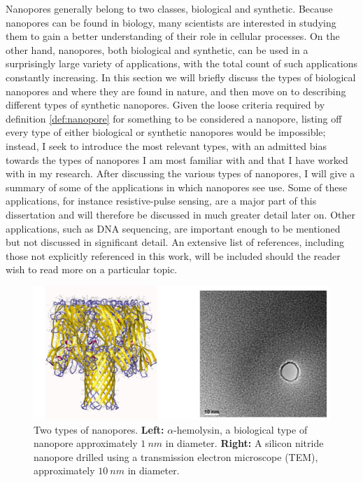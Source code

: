 		Nanopores generally belong to two classes, biological and synthetic. Because nanopores can be found in biology, many scientists are interested in studying them to gain a better understanding of their role in cellular processes. On the other hand, nanopores, both biological and synthetic, can be used in a surprisingly large variety of applications, with the total count of such applications constantly increasing. In this section we will briefly discuss the types of biological nanopores and where they are found in nature, and then move on to describing different types of synthetic nanopores. Given the loose criteria required by definition \ref{def:nanopore} for something to be considered a nanopore, listing off every type of either biological or synthetic nanopores would be impossible; instead, I seek to introduce the most relevant types, with an admitted bias towards the types of nanopores I am most familiar with and that I have worked with in my research. After discussing the various types of nanopores, I will give a summary of some of the applications in which nanopores see use. Some of these applications, for instance resistive-pulse sensing, are a major part of this dissertation and will therefore be discussed in much greater detail later on. Other applications, such as DNA sequencing, are important enough to be mentioned but not discussed in significant detail. An extensive list of references, including those not explicitly referenced in this work, will be included should the reader wish to read more on a particular topic.

		\begin{figure}[h]
			\includegraphics[width=\textwidth]{bio_synth_nanopores.png}
			\caption{Two types of nanopores. \textbf{Left:} $\alpha$-hemolysin, a biological type of nanopore approximately $\SI{1}{nm}$ in diameter. \textbf{Right:} A silicon nitride nanopore drilled using a transmission electron microscope (TEM), approximately $\SI{10}{nm}$ in diameter.}
		\end{figure}

